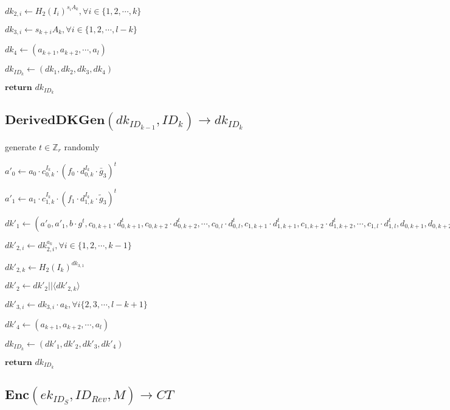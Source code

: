 \documentclass[a4paper]{article}
\begin{document}
$\textit{dk}_{2, i} \gets H_2(I_i)^{s_i A_k}, \forall i \in \{1, 2, \cdots, k\}$

$\textit{dk}_{3, i} \gets s_{k + i}A_k, \forall i \in \{1, 2, \cdots, l - k\}$

$\textit{dk}_4 \gets (a_{k + 1}, a_{k + 2}, \cdots, a_l)$

$\textit{dk}_{\textit{ID}_k} \gets (\textit{dk}_1, \textit{dk}_2, \textit{dk}_3, \textit{dk}_4)$

$\textbf{return }\textit{dk}_{\textit{ID}_k}$

\subsection{$\textbf{DerivedDKGen}(\textit{dk}_{\textit{ID}_{k - 1}}, \textit{ID}_k) \rightarrow \textit{dk}_{\textit{ID}_k}$}

generate $t \in \mathbb{Z}_r$ randomly

$a'_0 \gets a_0 \cdot c_{0, k}^{I_k} \cdot (f_0 \cdot d_{0, k}^{I_k} \cdot \bar{g}_3)^t$

$a'_1 \gets a_1 \cdot c_{1, k}^{I_k} \cdot (f_1 \cdot d_{1, k}^{I_k} \cdot \tilde{g}_3)^t$

$\textit{dk}'_1 \gets (
a'_0, a'_1, b \cdot g^t, 
c_{0, k + 1} \cdot d_{0, k + 1}^t, c_{0, k + 2} \cdot d_{0, k + 2}^t, \cdots, c_{0, l} \cdot d_{0, l}^t, 
c_{1, k + 1} \cdot d_{1, k + 1}^t, c_{1, k + 2} \cdot d_{1, k + 2}^t, \cdots, c_{1, l} \cdot d_{1, l}^t, 
d_{0, k + 1}, d_{0, k + 2}, \cdots, d_{0, l}, 
d_{1, k + 1}, d_{1, k + 2}, \cdots, d_{1, l}, 
f_0 \cdot c_{0, k}^{I_k}, f_1 \cdot c_{1, k}^{I_k}
)$

$\textit{dk}'_{2, i} \gets \textit{dk}_{2, i}^{a_k}, \forall i \in \{1, 2, \cdots, k - 1\}$

$\textit{dk}'_{2, k} \gets H_2(I_k)^{\textit{dk}_{3, 1}}$

$\textit{dk}'_2 \gets \textit{dk}'_2 || \langle\textit{dk}'_{2, k}\rangle$

$\textit{dk}'_{3, i} \gets \textit{dk}_{3, i} \cdot a_k, \forall i \{2, 3, \cdots, l - k + 1\}$

$\textit{dk}'_4 \gets (a_{k + 1}, a_{k + 2}, \cdots, a_l)$

$\textit{dk}_{\textit{ID}_k} \gets (\textit{dk}'_1, \textit{dk}'_2, \textit{dk}'_3, \textit{dk}'_4)$

$\textbf{return }\textit{dk}_{\textit{ID}_k}$

\subsection{$\textbf{Enc}(\textit{ek}_{\textit{ID}_S}, \textit{ID}_\textit{Rev}, M) \rightarrow \textit{CT}$}
\end{document}
